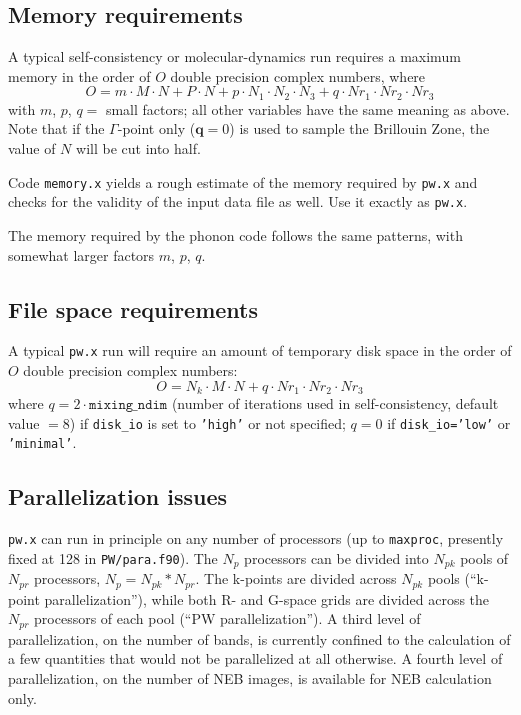 \documentclass[12pt,a4paper]{article}
\begin{document}
\subsection{Memory requirements}

A typical self-consistency or molecular-dynamics run requires 
a maximum memory in the order
of $O$ double precision complex numbers, where
$$
O = m \cdot M \cdot N + P \cdot N + p \cdot N_1 \cdot N_2 \cdot N_3
    + q \cdot Nr_1 \cdot Nr_2 \cdot Nr_3
$$
with $m$, $p$, $q=$ small factors; all other variables have the same
meaning as above.
Note that if the $\Gamma$-point only ($\mathbf{q}=0$) is used to
sample the Brillouin Zone, the value of $N$ will be cut into half.

Code \texttt{memory.x} yields a rough estimate of the memory required 
by \texttt{pw.x} and checks for the validity of the input data file as 
well. Use it exactly as \texttt{pw.x}.

The memory required by the phonon code follows the same patterns,
with somewhat larger factors $m$, $p$, $q$.

\subsection{File space requirements}

A typical \texttt{pw.x} run will require an amount of temporary disk
space in the order of $O$ double precision complex numbers:
$$
O = N_k \cdot M \cdot N + q \cdot Nr_1 \cdot Nr_2 \cdot Nr_3
$$
where $q=2 \cdot \mathtt{mixing\_ndim}$ (number of iterations used in
self-consistency, default value $=8$) if \texttt{disk\_io} is set to
\texttt{'high'} or not specified;
$q=0$ if \texttt{disk\_io='low'} or \texttt{'minimal'}.

\subsection{Parallelization issues}
  \label{parissues}

\texttt{pw.x} can run in principle on any number of processors (up to
\texttt{maxproc}, presently fixed at 128 in \texttt{PW/para.f90}). 
The $N_p$ processors can be divided into $N_{pk}$ pools of $N_{pr}$
processors, $N_p=N_{pk}*N_{pr}$. 
The k-points are divided across $N_{pk}$ pools (``k-point
parallelization''), while both R- and G-space grids are divided across
the $N_{pr}$ processors of each pool (``PW parallelization'').
A third level of parallelization, on the number of bands, is 
currently confined to the calculation of a few quantities that 
would not be parallelized at all otherwise.
A fourth level of parallelization, on the number of NEB images,
is available for NEB calculation only.
\end{document}
